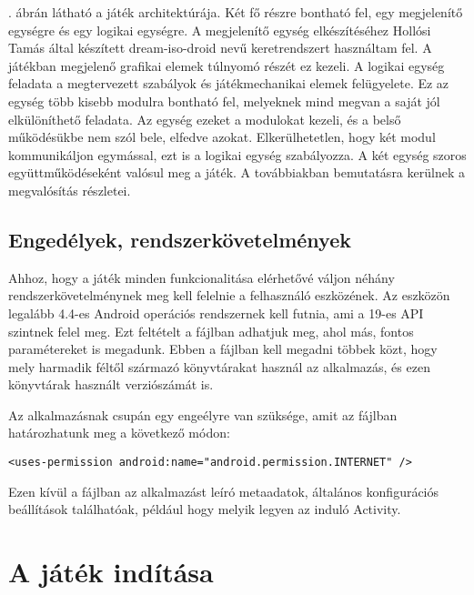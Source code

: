 . ábrán látható a játék architektúrája. 
Két fő részre bontható fel, egy megjelenítő egységre és egy logikai egységre. 
A megjelenítő egység elkészítéséhez Hollósi Tamás által készített dream-iso-droid nevű keretrendszert használtam fel. 
A játékban megjelenő grafikai elemek túlnyomó részét ez kezeli. 
A logikai egység feladata a megtervezett szabályok és játékmechanikai elemek felügyelete. 
Ez az egység több kisebb modulra bontható fel, melyeknek mind megvan a saját jól elkülöníthető feladata. 
Az egység ezeket a modulokat kezeli, és a belső működésükbe nem szól bele, elfedve azokat. 
Elkerülhetetlen, hogy két modul kommunikáljon egymással, ezt is a logikai egység szabályozza. 
A két egység szoros együttműködéseként valósul meg a játék. 
A továbbiakban bemutatásra kerülnek a megvalósítás részletei. 


\subsection*{Engedélyek, rendszerkövetelmények}
\label{requirements}

Ahhoz, hogy a játék minden funkcionalitása elérhetővé váljon néhány rendszerkövetelménynek meg kell felelnie a felhasználó eszközének. 
Az eszközön legalább 4.4-es Android operációs rendszernek kell futnia, ami a 19-es API szintnek felel meg.
Ezt feltételt a  fájlban adhatjuk meg, ahol más, fontos paramétereket is megadunk. 
Ebben a fájlban kell megadni többek közt, hogy mely harmadik féltől származó könyvtárakat használ az alkalmazás, és ezen könyvtárak használt verziószámát is. 

Az alkalmazásnak csupán egy engeélyre van szüksége, amit az  fájlban határozhatunk meg a következő módon:

\begin{lstlisting}
<uses-permission android:name="android.permission.INTERNET" />
\end{lstlisting}

Ezen kívül a fájlban az alkalmazást leíró metaadatok, általános konfigurációs beállítások találhatóak, például hogy melyik legyen az induló Activity.

\section{A játék indítása}
\label{jatekinditas}

